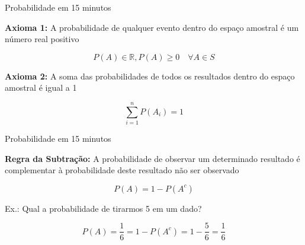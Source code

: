 \documentclass{beamer}\usepackage[]{graphicx}\usepackage[]{color}
\begin{document}
\begin{frame}{Probabilidade em 15 minutos}

\textbf{Axioma 1:}
A probabilidade de qualquer evento dentro do espaço amostral é um número real positivo

\begin{equation*}
    P(A) \in \mathbb{R}, P(A) \geq 0  \quad \forall A \in S
\end{equation*}

\textbf{Axioma 2:}
A soma das probabilidades de todos os resultados dentro do espaço amostral é igual a 1

\begin{equation*}
    \sum_{i=1}^{n}{P(A_i)= 1}
\end{equation*}

\end{frame} 


\begin{frame}{Probabilidade em 15 minutos}

\textbf{Regra da Subtração:} A probabilidade de observar um determinado resultado é complementar à probabilidade deste resultado não ser observado


\begin{equation*}
    P(A) = 1 - P(A^c) 
\end{equation*}

\alert{Ex.:} Qual a probabilidade de tirarmos 5 em um dado?


\begin{equation*}
    P(A) = \frac{1}{6} = 1 - P(A^c) = 1 - \frac{5}{6} = \frac{1}{6}
\end{equation*}



\end{frame} 
\end{document}
